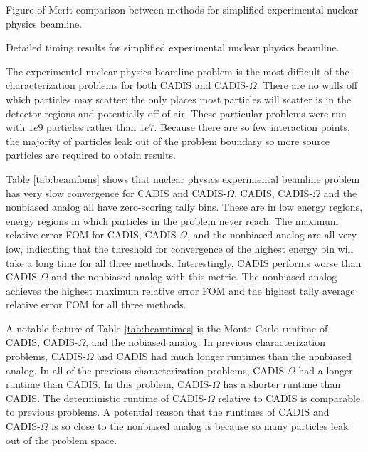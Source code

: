 \begin{table}[h!]
  \centering
  
  \caption[Figure of Merit comparison between methods for simplified
    experimental nuclear physics beamline.]
    {Figure of Merit comparison between methods for simplified experimental
    nuclear physics beamline.}
  \label{tab:beamfoms}
\end{table}

\begin{table}[h!]
  \centering
  
  \caption[Detailed timing results for simplified experimental nuclear physics
  beamline.]
  {Detailed timing results for simplified experimental nuclear physics beamline.}
  \label{tab:beamtimes}
\end{table}

The experimental nuclear physics beamline problem is the most
difficult of the characterization problems for both CADIS and CADIS-$\Omega$.
There are no walls off which
particles may scatter; the only places most particles will scatter is in the
detector regions and potentially off of air. These particular problems were run
with $1e9$ particles rather than $1e7$. Because there are so few interaction
points, the majority of particles leak out of the problem boundary so
more source particles are required to obtain results.

Table \ref{tab:beamfoms} shows that nuclear physics experimental beamline
problem has very slow convergence for
CADIS and CADIS-$\Omega$. CADIS, CADIS-$\Omega$ and the nonbiased analog all have
zero-scoring tally bins. These are in low energy regions, energy regions in
which particles in the problem never reach.
The maximum relative error FOM for CADIS, CADIS-$\Omega$,
and the nonbiased analog are all very low, indicating that the threshold for
convergence of the highest energy bin will take a long time for all three
methods. Interestingly, CADIS performs worse than CADIS-$\Omega$ and the
nonbiased analog with this metric. The nonbiased analog achieves the highest
maximum relative error FOM and the highest tally average relative error FOM for all
three methods.

A notable feature of Table \ref{tab:beamtimes} is the Monte Carlo runtime of
CADIS, CADIS-$\Omega$, and the nobiased analog. In previous characterization
problems, CADIS-$\Omega$ and CADIS had much longer runtimes than the nonbiased
analog. In all of the previous characterization problems, CADIS-$\Omega$ had a
longer runtime than CADIS. In this problem, CADIS-$\Omega$ has a shorter runtime
than CADIS. The deterministic runtime of CADIS-$\Omega$ relative to CADIS
is comparable to previous problems. A potential reason that the runtimes of
CADIS and CADIS-$\Omega$ is so close to the nonbiased analog is because so many
particles leak out of the problem space.

